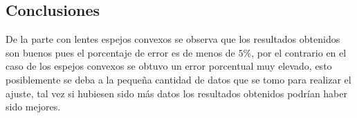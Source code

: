 \documentclass[13,twocolumn,letterpaper]{article}
\begin{document}
\begin{multicols}{2}
	
	\section*{Conclusiones}
	{
		De la parte con lentes espejos convexos se observa que los resultados obtenidos son buenos pues el porcentaje de error es de menos de $5\%$, por el contrario  en el caso de los espejos convexos se obtuvo un error porcentual muy elevado, esto posiblemente se deba a la pequeña cantidad de datos que se tomo para realizar el ajuste, tal vez si hubiesen sido más datos los resultados obtenidos podrían haber sido mejores.
	}
	
	
	\nocite{Hecht}\nocite{Rossi}\nocite{Sears}\nocite{Born}\nocite{Tipler}\nocite{Feynman}\nocite{Res}
	
	

\end{multicols}
\end{document}
